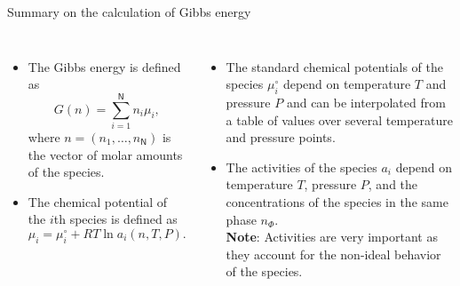 %
%
\begin{frame}{Summary on the calculation of Gibbs energy}
	\begin{columns}[t]
		
		\begin{itemize}[<+->]
			\item The \alert{Gibbs energy} is defined as
			\[
			G(n)=\sum_{i=1}^{\mathsf{N}}n_{i}\mu_{i},
			\]
			where $n=(n_{1},\ldots,n_{\mathsf{N}})$ is the vector of molar amounts
			of the species. 
			\item The \alert{chemical potential} of the $i$th species is defined as
			\[
			\mu_{i}=\mu_{i}^{\circ}+RT\ln a_{i}(n, T, P).
			\]
		\end{itemize}
		
		\begin{itemize}[<+->]
			\item The \alert{standard chemical potentials} of the species $\mu_{i}^{\circ}$
			depend on temperature $T$ and pressure $P$ and can be interpolated
			from a table of values over several temperature and pressure points.
			\item The \alert{activities} of the species $a_{i}$ depend on temperature
			$T$, pressure $P$, and the concentrations of the species in the
			same phase $n_{\Phi}$. \\
			{\bf Note}: Activities are very important as they account for the non-ideal behavior of the species. 
		\end{itemize}
	\end{columns}
	
\end{frame}
%
%
